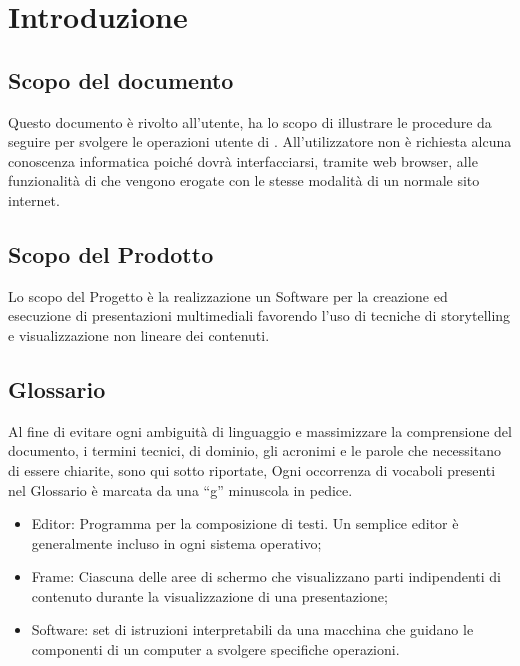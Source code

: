 \section{Introduzione}
\subsection{Scopo del documento}
Questo documento è rivolto all’utente, ha lo scopo di illustrare le procedure da seguire per svolgere le operazioni utente di \premi . All'utilizzatore non è richiesta alcuna conoscenza informatica poiché dovrà interfacciarsi, tramite web browser, alle funzionalità di \premi che vengono erogate con le stesse modalità di un normale sito internet.
\subsection{Scopo del Prodotto}
Lo scopo del Progetto è la realizzazione un Software per la creazione ed esecuzione di presentazioni multimediali favorendo l’uso di tecniche di storytelling e visualizzazione non lineare dei contenuti.
\subsection{Glossario}
Al fine di evitare ogni ambiguità di linguaggio e massimizzare la comprensione del documento, i termini tecnici, di dominio, gli acronimi e le parole che necessitano di essere chiarite, sono qui sotto riportate, Ogni occorrenza di vocaboli presenti nel Glossario è marcata da una “g” minuscola in pedice.
\begin{itemize}
\item Editor: Programma per la composizione di testi. Un semplice editor è generalmente incluso in ogni sistema operativo;
\item Frame: Ciascuna delle aree di schermo che visualizzano parti indipendenti di contenuto durante la visualizzazione di una presentazione;
\item Software: set di istruzioni interpretabili da una macchina che guidano le componenti di un computer a svolgere specifiche operazioni.

\end{itemize}



